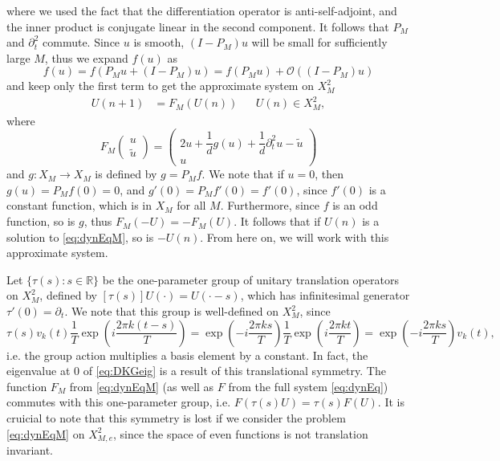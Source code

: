 \documentclass[12pt,reqno]{amsart}
\def\R{{\mathbb R}}
\begin{document}
where we used the fact that the differentiation operator is anti-self-adjoint, and the inner product is conjugate linear in the second component. It follows that $P_M$ and $\partial_t^2$ commute. Since $u$ is smooth, $(I-P_M)u$ will be small for sufficiently large $M$, thus we expand $f(u)$ as
\[
f(u) = f( P_M u + (I-P_M)u) = f(P_M u) + \mathcal{O}((I-P_M)u)
\]
and keep only the first term to get the approximate system on $X_M^2$
\begin{align}\label{eq:dynEqM}
U(n+1) &= F_M(U(n)) && U(n) \in X_M^2,
\end{align}
where
\begin{equation}\label{eq:FM}
F_M\begin{pmatrix}u \\ \tilde{u} \end{pmatrix} = 
\begin{pmatrix}2u  + \dfrac{1}{d}g(u) + \dfrac{1}{d} \partial_t^2 u - \tilde{u} \\
u
\end{pmatrix}
\end{equation}
and $g: X_M \rightarrow X_M$ is defined by $g = P_M f$. We note that if $u = 0$, then $g(u) = P_M f(0) = 0$, and $g'(0) = P_M f'(0) = f'(0)$, since $f'(0)$ is a constant function, which is in $X_M$ for all $M$. Furthermore, since $f$ is an odd function, so is $g$, thus $F_M(-U) = -F_M(U)$. It follows that if $U(n)$ is a solution to \cref{eq:dynEqM}, so is $-U(n)$. From here on, we will work with this approximate system.

Let $\{\tau(s) : s \in \R\}$ be the one-parameter group of unitary translation operators on $X_M^2$, defined by $[\tau(s)]U(\cdot) = U(\cdot - s)$, which has infinitesimal generator $\tau'(0) = \partial_t$. We note that this group is well-defined on $X_M^2$, since 
\[
\tau(s) v_k(t) 
\frac{1}{T} \exp\left( i \frac{2 \pi k (t-s)}{T}\right) 
= \exp\left( -i \frac{2 \pi k s}{T} \right) \frac{1}{T} \exp\left( i \frac{2 \pi k t}{T}\right) 
= \exp\left( -i \frac{2 \pi k s}{T} \right) v_k(t),
\]
i.e. the group action multiplies a basis element by a constant. In fact, the eigenvalue at 0 of \cref{eq:DKGeig} is a result of this translational symmetry. The function $F_M$ from \cref{eq:dynEqM} (as well as $F$ from the full system \cref{eq:dynEq}) commutes with this one-parameter group, i.e. $F(\tau(s) U) = \tau(s) F(U)$. It is cruicial to note that this symmetry is lost if we consider the problem \cref{eq:dynEqM} on $X_{M,e}^2$, since the space of even functions is not translation invariant. 
\end{document}
